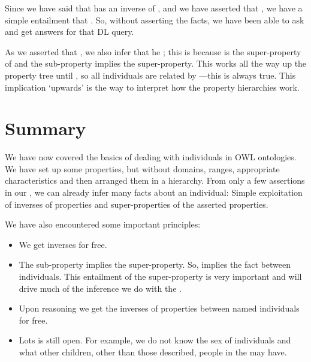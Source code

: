 Since we have said that  has an inverse of , and we have asserted that \irds {} \ids{}, we have a simple entailment that \ids {} \irds{}. So, without asserting the  facts, we have been able to ask and get answers for that DL query.

As we asserted that \irds {} \ids{}, we also infer that he  \ids{}; this is because  is the super-property of  and the sub-property implies the super-property. This works all the way up the property tree until , so all individuals are related by ---this is always true. This implication `upwards' is the way to interpret how the property hierarchies work. 


\section{Summary}
We have now covered the basics of dealing with individuals in OWL ontologies. We have set up some properties, but without domains, ranges, appropriate characteristics and then arranged them in a hierarchy. From only a few assertions in our \fhkb, we can already infer many facts about an individual: Simple exploitation of inverses of properties and super-properties of the asserted properties.

We have also encountered some important principles:
\begin{itemize}
\item We get inverses for free.
\item The sub-property implies the super-property. So,  implies the  fact between individuals. This entailment of the super-property is very important and will drive much of the  inference we do with the \fhkb.
\item Upon reasoning we get the inverses of properties between named individuals for free.
\item Lots is still open. For example, we do not know the sex of individuals and what other children, other than those described, people in the \fhkb may have.
\end{itemize}



